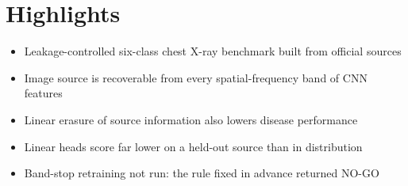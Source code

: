 \documentclass[12pt]{article}
\begin{document}
\section*{Highlights}
\begin{itemize}
\item Leakage-controlled six-class chest X-ray benchmark built from official sources
\item Image source is recoverable from every spatial-frequency band of CNN features
\item Linear erasure of source information also lowers disease performance
\item Linear heads score far lower on a held-out source than in distribution
\item Band-stop retraining not run: the rule fixed in advance returned NO-GO
\end{itemize}
\end{document}
